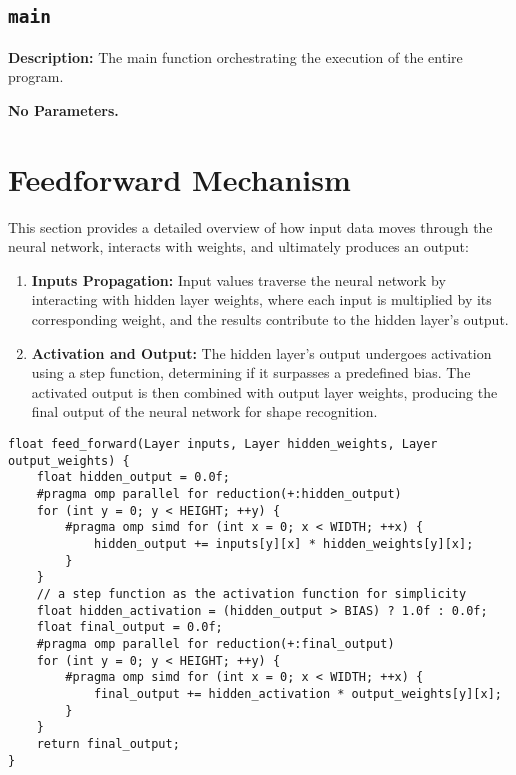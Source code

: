 \documentclass{article}
\begin{document}
\subsection*{\texttt{main}}

\textbf{Description:} The main function orchestrating the execution of the entire program.

\textbf{No Parameters.}


\section{Feedforward Mechanism}

This section provides a detailed overview of how input data moves through the neural network, interacts with weights, and ultimately produces an output:



\begin{enumerate}
    \item \textbf{Inputs Propagation:} Input values traverse the neural network by interacting with hidden layer weights, where each input is multiplied by its corresponding weight, and the results contribute to the hidden layer's output.

    \item \textbf{Activation and Output:} The hidden layer's output undergoes activation using a step function, determining if it surpasses a predefined bias. The activated output is then combined with output layer weights, producing the final output of the neural network for shape recognition.
\end{enumerate}



\lstset{language=C, breaklines=true, basicstyle=\ttfamily}
\begin{lstlisting}
float feed_forward(Layer inputs, Layer hidden_weights, Layer output_weights) {
    float hidden_output = 0.0f;
    #pragma omp parallel for reduction(+:hidden_output)
    for (int y = 0; y < HEIGHT; ++y) {
        #pragma omp simd for (int x = 0; x < WIDTH; ++x) {
            hidden_output += inputs[y][x] * hidden_weights[y][x];
        }
    }
    // a step function as the activation function for simplicity
    float hidden_activation = (hidden_output > BIAS) ? 1.0f : 0.0f;
    float final_output = 0.0f;
    #pragma omp parallel for reduction(+:final_output)
    for (int y = 0; y < HEIGHT; ++y) {
        #pragma omp simd for (int x = 0; x < WIDTH; ++x) {
            final_output += hidden_activation * output_weights[y][x];
        }
    }
    return final_output;
}
\end{lstlisting}
\end{document}
